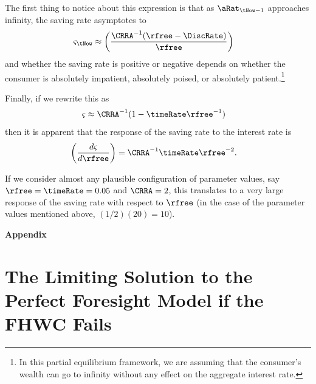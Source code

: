 The first thing to notice about this expression is that as $\aRat_{\tNow-1}$ approaches infinity, the saving rate asymptotes to
\begin{equation}\begin{gathered}\begin{aligned}
\varsigma_{\tNow} & \approx  \left(\frac{\CRRA^{-1}(\rfree-\DiscRate)}{\rfree}\right)
\end{aligned}\end{gathered}\end{equation}
and whether the saving rate is positive or negative depends on whether the consumer is absolutely impatient, absolutely poised, or absolutely patient.\footnote{In this partial equilibrium framework, we are assuming that the consumer's wealth can go to infinity without any effect on the aggregate interest rate.}

Finally, if we rewrite this as
\begin{equation}\begin{gathered}\begin{aligned}
\varsigma & \approx  \CRRA^{-1} (1 - \timeRate \rfree^{-1})
\end{aligned}\end{gathered}\end{equation}
then it is apparent that the response of the saving rate to the interest rate is
\begin{equation}\begin{gathered}\begin{aligned}
  \label{eq:dsdr}
  \left(\frac{d \varsigma}{d \rfree}\right) & =  \CRRA^{-1}\timeRate \rfree^{-2}.
\end{aligned}\end{gathered}\end{equation}

If we consider almost any plausible configuration of parameter values, say $\rfree = \timeRate=0.05$ and $\CRRA = 2$, this translates to a very large response of the saving rate with respect to $\rfree$ (in the case of the parameter values mentioned above, $(1/2)(20)=10$).

\pagebreak\appendix
\centerline{\bf \LARGE Appendix}\medskip

\setcounter{section}{0}

\section{The Limiting Solution to the Perfect Foresight Model if the FHWC Fails}\label{sec:PFwhenFHWfails}

